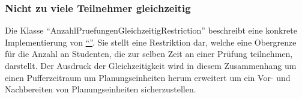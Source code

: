 \subsubsection{Nicht zu viele Teilnehmer gleichzeitig}\label{subsubsec:nicht-zu-viele-teilnehmer-gleichzeitig}
Die Klasse \enquote{AnzahlPruefungenGleichzeitigRestriction} beschreibt eine konkrete Implementierung von
\hyperref[subsubsec:anzahl-gleichzeitig-zu-hoch]{\enquote{}}.
Sie stellt eine Restriktion dar, welche eine Obergrenze für die Anzahl an Studenten,
die zur selben Zeit an einer Prüfung teilnehmen, darstellt.
Der Ausdruck der Gleichzeitigkeit wird in diesem Zusammenhang um einen Pufferzeitraum
um Planungseinheiten herum erweitert um ein Vor- und Nachbereiten von Planungseinheiten sicherzustellen.
